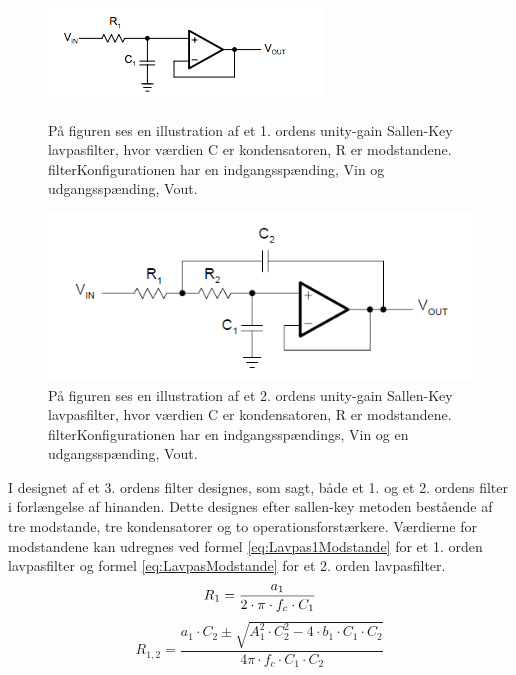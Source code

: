 \begin{figure}[H]
	\centering
	\begin{minipage}[b]{0.45\textwidth}
		\includegraphics[width=\textwidth]{figures/cProblemloesning/Lavpasfilter1_teoretisk.PNG}
		\caption{På figuren ses en illustration af et 1. ordens unity-gain Sallen-Key lavpasfilter, hvor værdien C er kondensatoren, R er modstandene. filterKonfigurationen har en indgangsspænding, Vin og udgangsspænding, Vout. \citep{Carter2013}}
		\label{fig:SallenKey1}
	\end{minipage}
	\hfill
	\begin{minipage}[b]{0.45\textwidth}
		\includegraphics[width=\textwidth]{figures/cProblemloesning/Sallenlavpas.PNG}
		\caption{På figuren ses en illustration af et 2. ordens unity-gain Sallen-Key lavpasfilter, hvor værdien C er kondensatoren, R er modstandene. filterKonfigurationen har en indgangsspændings, Vin og en udgangsspænding, Vout. \citep{Carter2013}}
		\label{fig:SallenKey2}
	\end{minipage}
\end{figure}

I designet af et 3. ordens filter designes, som sagt, både et 1. og et 2. ordens filter i forlængelse af hinanden. Dette designes efter sallen-key metoden bestående af tre modstande, tre kondensatorer og to operationsforstærkere. Værdierne for modstandene kan udregnes ved formel \eqref{eq:Lavpas1Modstande} for et 1. orden lavpasfilter og formel \eqref{eq:LavpasModstande} for et  2. orden lavpasfilter.  
\begin{equation} \label{eq:Lavpas1Modstande}
R_{1} = \frac{a_1}{2 \cdot \pi \cdot f_c \cdot C_1} \\
\end{equation}
\begin{equation}
 \label{eq:LavpasModstande}
R_{1,2} = \frac{a_1 \cdot C_2 \pm \sqrt{A_1^2 \cdot C_2^2 - 4 \cdot b_1 \cdot C_1 \cdot C_2}}{4 \pi \cdot f_c \cdot C_1 \cdot C_2}
\end{equation}

